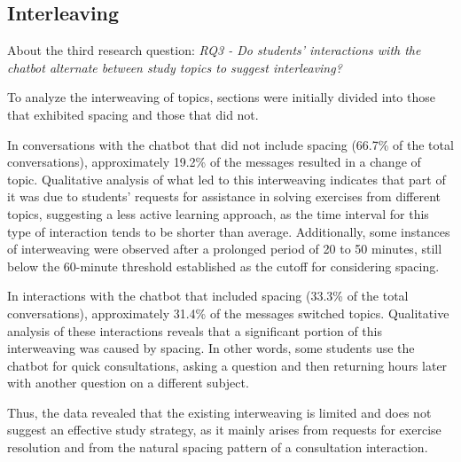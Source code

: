 \documentclass[a4paper,twoside]{article}
\begin{document}
\subsection{Interleaving}

About the third research question: \textit{RQ3 - Do students' interactions with
the chatbot alternate between study topics to suggest interleaving?}

To analyze the interweaving of topics, sections were initially divided into
those that exhibited spacing and those that did not.

In conversations with the chatbot that did not include spacing (66.7\% of the total
conversations), approximately 19.2\% of the messages resulted in a change of
topic. Qualitative analysis of what led to this interweaving indicates that
part of it was due to students' requests for assistance in solving exercises
from different topics, suggesting a less active learning approach, as the time
interval for this type of interaction tends to be shorter than average.
Additionally, some instances of interweaving were observed after a prolonged
period of 20 to 50 minutes, still below the 60-minute threshold established as
the cutoff for considering spacing.

In interactions with the chatbot that included spacing (33.3\% of the total
conversations), approximately 31.4\% of the messages switched topics.
Qualitative analysis of these interactions reveals that a significant portion
of this interweaving was caused by spacing. In other words, some students use
the chatbot for quick consultations, asking a question and then returning hours
later with another question on a different subject.

Thus, the data revealed that the existing interweaving is limited and does not
suggest an effective study strategy, as it mainly arises from requests for
exercise resolution and from the natural spacing pattern of a consultation
interaction.
\end{document}
